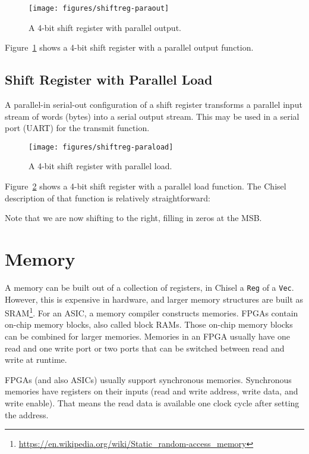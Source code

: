 \documentclass[%
    10pt,
    headinclude, footexclude,
    openright, %
    notitlepage,
    cleardoubleempty,
    headsepline,
    pointlessnumbers,
    bibtotoc, idxtotoc,
    ]{scrbook}
\newcommand{\scale}{0.7}
\newcommand{\code}[1]{{\lstinline[basicstyle=\small\ttfamily]{#1}}}
\newcommand{\myref}[2]{\href{#1}{#2}}
\renewcommand{\myref}[2]{{#2}{\footnote{\url{#1}}}}
\begin{document}
\begin{figure}
  \centering
  \texttt{[image: figures/shiftreg-paraout]}
  \caption{A 4-bit shift register with parallel output.}
  \label{fig:shiftreg-paraout}
\end{figure}

\noindent Figure~\ref{fig:shiftreg-paraout} shows a 4-bit shift register with a parallel output function.

\subsection{Shift Register with Parallel Load}

A parallel-in serial-out configuration of a shift register transforms a parallel input stream of words (bytes)
into a serial output stream.
This may be used in a serial port (UART) for the transmit function.

\begin{figure}
  \centering
  \texttt{[image: figures/shiftreg-paraload]}
  \caption{A 4-bit shift register with parallel load.}
  \label{fig:shiftreg-paraload}
\end{figure}

Figure~\ref{fig:shiftreg-paraload} shows a 4-bit shift register with a parallel load function.
The Chisel description of that function is relatively straightforward:


Note that we are now shifting to the right, filling in zeros at the MSB.

\section{Memory}
\label{ref:memory}

A memory can be built out of a collection of registers, in Chisel a \code{Reg} of a \code{Vec}.
However, this is expensive in hardware, and larger memory structures are built
as \myref{https://en.wikipedia.org/wiki/Static_random-access_memory}{SRAM}.
For an ASIC, a memory compiler constructs memories.
FPGAs contain on-chip memory blocks, also called block RAMs.
Those on-chip memory blocks can be combined for larger memories.
Memories in an FPGA usually have one read and one write port or
two ports that can be switched between read and write at runtime.

FPGAs (and also ASICs) usually support synchronous memories.
Synchronous memories have registers on their inputs (read and write address, write data,
and write enable). That means the read data is available one clock
cycle after setting the address.
\end{document}
